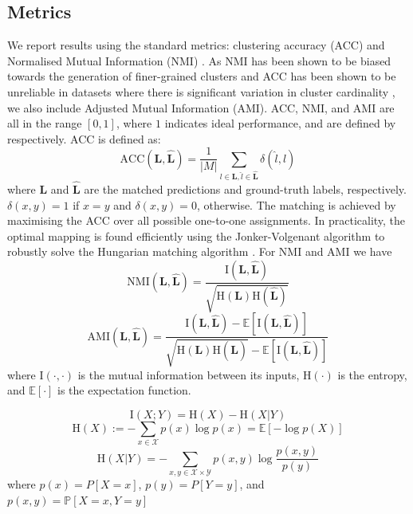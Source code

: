 \documentclass[../thesis.tex]{subfiles}
\begin{document}
\subsection{Metrics}
We report results using the standard metrics: clustering accuracy (ACC) \cite{Yang2010} and Normalised Mutual Information (NMI) \cite{Strehl2002}. As NMI has been shown to be biased towards the generation of finer-grained clusters and ACC has been shown to be unreliable in datasets where there is significant variation in cluster cardinality \cite{Vinh:2010:ITM:1756006.1953024}, we also include Adjusted Mutual Information (AMI). 
ACC, NMI, and AMI are all in the range $[0,1]$, where $1$ indicates ideal performance, and are defined by  
respectively.
ACC is defined as: 
\begin{equation}\label{eq__DMS__ACC}
    \text{ACC}(\mathbf{L}, \hat{\mathbf{L}}) =         
    \frac{1}{|M|}\sum_{l \in{\mathbf{L}}, \hat{l} \in \hat{\mathbf{L}}} \delta(\hat{l}, l)
\end{equation}
where $\mathbf{L}$ and $\hat{\mathbf{L}}$ are the matched predictions and ground-truth labels, respectively.
$\delta(x, y) = 1$ if $x = y$ and $\delta(x, y) = 0$, otherwise. The matching is achieved by maximising the ACC over all possible one-to-one assignments. In practicality, the optimal mapping is found efficiently using the Jonker-Volgenant algorithm \cite{Crouse2016hungarianmatching} to robustly solve the Hungarian matching algorithm \cite{Kuhn1955}.
For NMI and AMI we have
\begin{equation}\label{eq__DMS__NMI}
    \text{NMI}(\mathbf{L}, \hat{\mathbf{L}}) = \frac{\mathrm{I}(\mathbf{L}, \hat{\mathbf{L}})}{\sqrt{\mathrm{H}(\mathbf{L})\mathrm{H}(\hat{\mathbf{L}})}}
\end{equation}
\begin{equation}\label{eq__DMS__AMI}
    \text{AMI}(\mathbf{L}, \hat{\mathbf{L}}) = \frac{\mathrm{I}(\mathbf{L}, \hat{\mathbf{L}}) - \mathbb{E}[\mathrm{I}(\mathbf{L, \hat{L}})]}{\sqrt{\mathrm{H}(\mathbf{L})\mathrm{H}(\hat{\mathbf{L}})} - \mathbb{E}[\mathrm{I}(\mathbf{L},\mathbf{\hat{L}})]}
\end{equation}
where $ \mathrm{I}(\cdot,\cdot)$ is the mutual information between its inputs, $\mathrm{H}(\cdot)$ is the entropy, and $\mathbb{E}[\cdot]$ is the expectation function. 

\begin{equation}
    \mathrm{I}(X ; Y) = \mathrm{H}(X) - \mathrm{H}(X | Y) 
\end{equation}
\begin{equation}
    \mathrm{H} (X):=-\sum _{x\in {\mathcal {X}}}p(x)\log p(x)=\mathbb{E} [-\log p(X)] 
\end{equation}
\begin{equation}
    \mathrm {H} (X|Y)=-\sum _{x,y\in {\mathcal {X}}\times {\mathcal {Y}}}p(x,y)\log {\frac {p(x,y)}{p(y)}}
\end{equation}
where $p(x)=P[X=x]$, $p(y)=P[Y=y]$, and $p(x,y)=\mathbb {P} [X=x,Y=y]$
\end{document}
